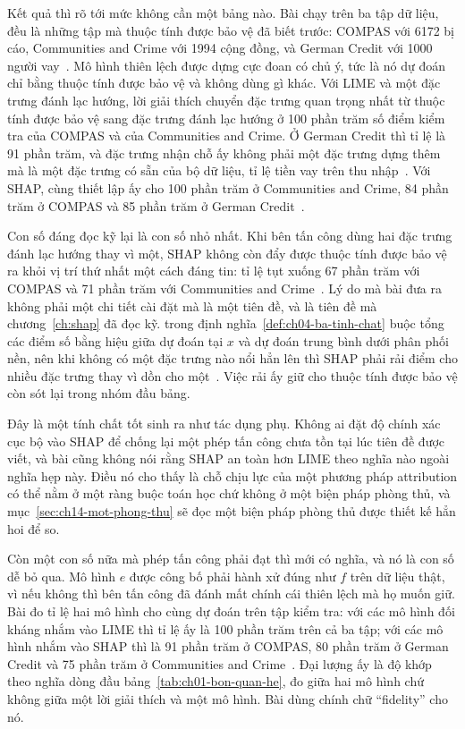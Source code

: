 %
Kết quả thì rõ tới mức không cần một bảng nào. Bài chạy trên ba tập dữ liệu,
đều là những tập mà thuộc tính được bảo vệ đã biết trước: COMPAS với 6172 bị
cáo, Communities and Crime với 1994 cộng đồng, và German Credit với 1000 người
vay~\autocite{mfooling}. Mô hình thiên lệch được dựng cực đoan có chủ ý, tức là
nó dự đoán chỉ bằng thuộc tính được bảo vệ và không dùng gì khác. Với LIME và
một đặc trưng đánh lạc hướng, lời giải thích chuyển đặc trưng quan trọng nhất
từ thuộc tính được bảo vệ sang đặc trưng đánh lạc hướng ở 100 phần trăm số điểm
kiểm tra của COMPAS và của Communities and Crime. Ở German Credit thì tỉ lệ là
91 phần trăm, và đặc trưng nhận chỗ ấy không phải một đặc trưng dựng thêm mà là
một đặc trưng có sẵn của bộ dữ liệu, tỉ lệ tiền vay trên thu
nhập~\autocite{mfooling}. Với SHAP, cùng thiết lập ấy cho 100 phần trăm ở
Communities and Crime, 84 phần trăm ở COMPAS và 85 phần trăm ở German
Credit~\autocite{mfooling}.

%
Con số đáng đọc kỹ lại là con số nhỏ nhất. Khi bên tấn công dùng hai đặc trưng
đánh lạc hướng thay vì một, SHAP không còn đẩy được thuộc tính được bảo vệ ra
khỏi vị trí thứ nhất một cách đáng tin: tỉ lệ tụt xuống 67 phần trăm với COMPAS
và 71 phần trăm với Communities and Crime~\autocite{mfooling}. Lý do mà bài đưa
ra không phải một chi tiết cài đặt mà là một tiên đề, và là tiên đề mà
chương~\ref{ch:shap} đã đọc kỹ.  trong
định nghĩa~\ref{def:ch04-ba-tinh-chat} buộc tổng các điểm số bằng hiệu giữa dự
đoán tại $x$ và dự đoán trung bình dưới phân phối nền, nên khi không có một đặc
trưng nào nổi hẳn lên thì SHAP phải rải điểm cho nhiều đặc trưng thay vì dồn
cho một~\autocite{mfooling}. Việc rải ấy giữ cho thuộc tính được bảo vệ còn sót
lại trong nhóm đầu bảng.

Đây là một tính chất tốt sinh ra như tác dụng phụ. Không ai đặt độ chính xác
cục bộ vào SHAP để chống lại một phép tấn công chưa tồn tại lúc tiên đề được
viết, và bài cũng không nói rằng SHAP an toàn hơn LIME theo nghĩa nào ngoài
nghĩa hẹp này. Điều nó cho thấy là chỗ chịu lực của một phương pháp attribution
có thể nằm ở một ràng buộc toán học chứ không ở một biện pháp phòng thủ, và
mục~\ref{sec:ch14-mot-phong-thu} sẽ đọc một biện pháp phòng thủ được thiết kế
hẳn hoi để so.

%
Còn một con số nữa mà phép tấn công phải đạt thì mới có nghĩa, và nó là con số
dễ bỏ qua. Mô hình $e$ được công bố phải hành xử đúng như $f$ trên dữ liệu
thật, vì nếu không thì bên tấn công đã đánh mất chính cái thiên lệch mà họ muốn
giữ. Bài đo tỉ lệ hai mô hình cho cùng dự đoán trên tập kiểm tra: với các mô
hình đối kháng nhắm vào LIME thì tỉ lệ ấy là 100 phần trăm trên cả ba tập; với
các mô hình nhắm vào SHAP thì là 91 phần trăm ở COMPAS, 80 phần trăm ở German
Credit và 75 phần trăm ở Communities and Crime~\autocite{mfooling}. Đại lượng
ấy là độ khớp theo nghĩa dòng đầu bảng~\ref{tab:ch01-bon-quan-he}, đo giữa hai
mô hình chứ không giữa một lời giải thích và một mô hình. Bài dùng chính chữ
\enquote{fidelity} cho nó.


